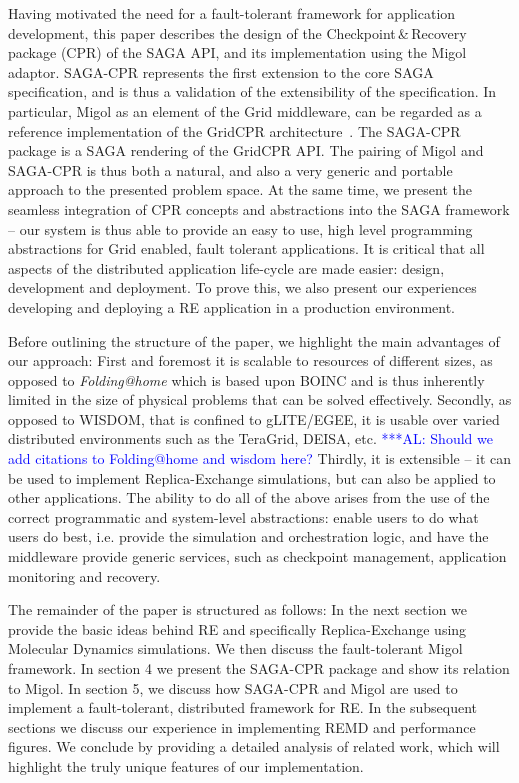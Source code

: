 \documentclass[conference,final]{IEEEtran}
\newcommand{\alnote}[1]{ {\textcolor{blue} { ***AL: #1 }}}
\newcommand{\jhanote}[1]{ {\textcolor{red} { ***SJ: #1 }}}
\newcommand{\alnote}[1]{}
\newcommand{\jhanote}[1]{}
\begin{document}
Having motivated the need for a fault-tolerant framework for
application development, this paper describes the design of the
Checkpoint\,\&\,Recovery package (CPR) of the SAGA API, and its
implementation using the Migol adaptor. SAGA-CPR represents the first
extension to the core SAGA specification, and is thus a validation of
the extensibility of the specification.  In particular, Migol as an
element of the Grid middleware, can be regarded as a reference
implementation of the GridCPR architecture~\cite{ogf_cpr_arch}.  
The SAGA-CPR package is a SAGA rendering of
the GridCPR API.%
The pairing of Migol and SAGA-CPR is thus both a natural, and also a
very generic and portable approach to the presented problem space.  At
the same time, we present the seamless integration of CPR concepts and
abstractions into the SAGA framework -- our system is thus able to
provide an easy to use, high level programming abstractions for Grid
enabled, fault tolerant applications.  It is critical that all aspects
of the distributed application life-cycle are made easier: design,
development and deployment. To prove this, we also present our
experiences developing and deploying a RE application in a production
environment.

Before outlining the structure of the paper, we highlight the main
advantages of our approach: First and foremost it is scalable to
resources of different sizes, as opposed to {\it Folding@home}
which is based upon BOINC and is thus inherently limited in the size of
physical problems that can be solved effectively. Secondly, as opposed
to WISDOM, that is confined to gLITE/EGEE, it is usable over varied
distributed environments such as the TeraGrid, DEISA, etc.
\alnote{Should we add citations to Folding@home and wisdom here?} 
Thirdly, it is extensible -- it can be used to implement Replica-Exchange simulations, 
but can also be applied to other applications.
The ability to do all of the above arises from the use of the
correct programmatic and system-level abstractions: enable users to do
what users do best, %
i.e. provide the simulation and orchestration logic, and 
have the middleware provide generic services,
such as checkpoint management, application monitoring and recovery.

The remainder of the paper is structured as follows: In the next
section we provide the basic ideas behind RE and specifically
Replica-Exchange using Molecular Dynamics simulations.  We then
discuss the fault-tolerant Migol framework. In section 4 we present
the SAGA-CPR package and show its relation to Migol. In section 5, we
discuss how SAGA-CPR and Migol are used to implement a fault-tolerant,
distributed framework for RE. In the subsequent sections we discuss
our experience in implementing REMD and performance figures. We
conclude by providing a detailed analysis of related work, which will
highlight the truly unique features of our implementation.
\end{document}
